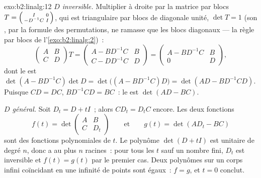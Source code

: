 \begin{solution}{exo:b2:linalg:12}
\emph{$D$ inversible.} Multiplier à droite par la matrice par blocs
$T = \begin{psmallmatrix} I & 0\\ -D^{-1}C & I\end{psmallmatrix}$,
qui est triangulaire par blocs de diagonale unité, $\det T = 1$ (son
, par la formule des permutations, ne ramasse que les blocs
diagonaux --- la règle par blocs de l'\cref{exo:b2:linalg:2})~:
\[
\begin{pmatrix} A & B\\ C & D\end{pmatrix} T
= \begin{pmatrix} A - BD^{-1}C & B\\ C - DD^{-1}C & D\end{pmatrix}
= \begin{pmatrix} A - BD^{-1}C & B\\ 0 & D\end{pmatrix},
\]
dont le  est $\det(A - BD^{-1}C)\det D = \det\bigl((A -
BD^{-1}C)D\bigr) = \det(AD - BD^{-1}CD)$. Puisque $CD = DC$,
$BD^{-1}CD = BC$~: le  est $\det(AD - BC)$.

\emph{$D$ général.} Soit $D_t = D + tI$~; alors $CD_t = D_tC$ encore.
Les deux fonctions
\[
f(t) = \det\begin{pmatrix} A & B\\ C & D_t\end{pmatrix}
\qquad\text{et}\qquad
g(t) = \det(AD_t - BC)
\]
sont des fonctions polynomiales de $t$. Le polynôme $\det(D + tI)$ est
unitaire de degré $n$, donc a au plus $n$ racines~: pour tous les $t$
sauf un nombre fini, $D_t$ est inversible et $f(t) = g(t)$ par le
premier cas. Deux polynômes sur un corps infini coïncidant en une
infinité de points sont égaux~: $f = g$, et $t = 0$ conclut.
\end{solution}

